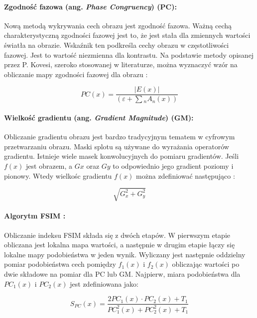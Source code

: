 \documentclass{article}
\begin{document}
\paragraph{Zgodność fazowa (ang. \emph{Phase Congruency}) (PC):}
Nową metodą wykrywania cech obrazu jest zgodność fazowa. Ważną cechą charakterystyczną zgodności fazowej jest to,
że jest stała dla zmiennych wartości światła na obrazie. Wskaźnik ten podkreśla cechy obrazu w częstotliwości fazowej. 
Jest to wartość niezmienna dla kontrastu. Na podstawie metody opisanej przez P. Kovesi, szeroko stosowanej w literaturze, 
można wyznaczyć wzór na obliczanie mapy zgodności fazowej dla obrazu \cite{pc}:

\begin{equation}
  PC(x) = \frac{|E(x)|}{(\varepsilon + \sum\limits{_{n}} A_n(x))}
\end{equation}

\paragraph{Wielkość gradientu  (ang. \emph{Gradient Magnitude}) (GM):}
Obliczanie gradientu obrazu jest bardzo tradycyjnym tematem w cyfrowym przetwarzaniu obrazu. 
Maski splotu są używane do wyrażania operatorów gradientu. Istnieje wiele masek konwolucyjnych do pomiaru gradientów. 
Jeśli $f(x)$ jest obrazem, a $Gx$ oraz $Gy$ to odpowiednio jego gradient poziomy i pionowy. 
Wtedy wielkośc gradientu $f(x)$ można zdefiniować następująco \cite{gm}:

\begin{equation}
  \sqrt{G^2_x+G^2_y}
\end{equation}

\paragraph{Algorytm FSIM \cite{fsim_alg}:}
Obliczanie indeksu FSIM składa się z dwóch etapów. 
W pierwszym etapie obliczana jest lokalna mapa wartości, a następnie w drugim etapie łączy się lokalne mapy podobieństwa w jeden wynik.
Wyliczany jest następnie oddzielny pomiar podobieństwa cech pomiędzy $f_1(x)$ i $f_2(x)$ obliczając wartości po dwie 
składowe na pomiar dla PC lub GM. Najpierw, miara podobieństwa dla $PC_1 (x)$ i $PC_2(x)$ jest zdefiniowana jako:

\begin{equation}
  S_{PC}(x) = \frac{2PC_1(x) \cdot PC_2(x) + T_1}{PC^2_1(x) + PC^2_2(x) + T_1}
\end{equation}
\end{document}
